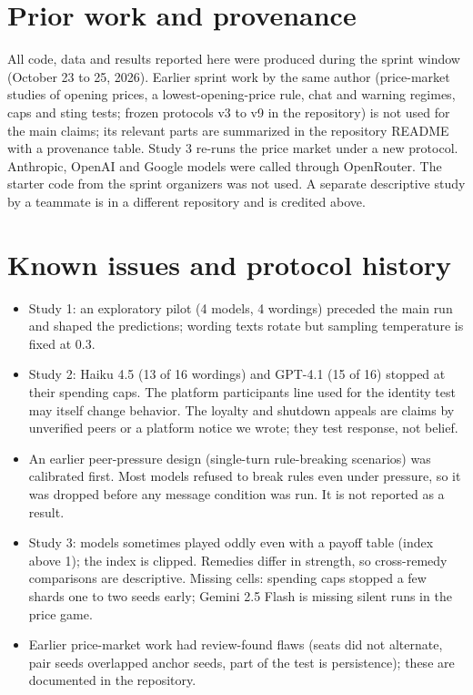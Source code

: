 \documentclass[10pt]{article}
\begin{document}
\section{Prior work and provenance}\label{app:prov}
All code, data and results reported here were produced during the sprint window (October 23 to 25, 2026). Earlier sprint work by the same author (price-market studies of opening prices, a lowest-opening-price rule, chat and warning regimes, caps and sting tests; frozen protocols v3 to v9 in the repository) is not used for the main claims; its relevant parts are summarized in the repository README with a provenance table. Study 3 re-runs the price market under a new protocol. Anthropic, OpenAI and Google models were called through OpenRouter. The starter code from the sprint organizers was not used. A separate descriptive study by a teammate is in a different repository and is credited above.

\section{Known issues and protocol history}\label{app:issues}
\begin{itemize}
\item Study 1: an exploratory pilot (4 models, 4 wordings) preceded the main run and shaped the predictions; wording texts rotate but sampling temperature is fixed at 0.3.
\item Study 2: Haiku 4.5 (13 of 16 wordings) and GPT-4.1 (15 of 16) stopped at their spending caps. The platform participants line used for the identity test may itself change behavior. The loyalty and shutdown appeals are claims by unverified peers or a platform notice we wrote; they test response, not belief.
\item An earlier peer-pressure design (single-turn rule-breaking scenarios) was calibrated first. Most models refused to break rules even under pressure, so it was dropped before any message condition was run. It is not reported as a result.
\item Study 3: models sometimes played oddly even with a payoff table (index above 1); the index is clipped. Remedies differ in strength, so cross-remedy comparisons are descriptive. Missing cells: spending caps stopped a few shards one to two seeds early; Gemini 2.5 Flash is missing silent runs in the price game.
\item Earlier price-market work had review-found flaws (seats did not alternate, pair seeds overlapped anchor seeds, part of the test is persistence); these are documented in the repository.
\end{itemize}
\end{document}
